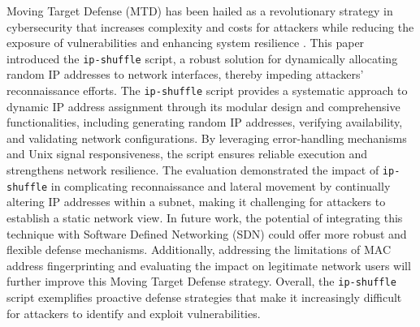 Moving Target Defense (MTD) has been hailed as a revolutionary strategy in cybersecurity that increases complexity and costs for attackers while reducing the exposure of vulnerabilities and enhancing system resilience \cite{cai2016network}. This paper introduced the \texttt{ip-shuffle} script, a robust solution for dynamically allocating random IP addresses to network interfaces, thereby impeding attackers' reconnaissance efforts.
The \texttt{ip-shuffle} script provides a systematic approach to dynamic IP address assignment through its modular design and comprehensive functionalities, including generating random IP addresses, verifying availability, and validating network configurations. By leveraging error-handling mechanisms and Unix signal responsiveness, the script ensures reliable execution and strengthens network resilience. The evaluation demonstrated the impact of \texttt{ip-shuffle} in complicating reconnaissance and lateral movement by continually altering IP addresses within a subnet, making it challenging for attackers to establish a static network view.
In future work, the potential of integrating this technique with Software Defined Networking (SDN) could offer more robust and flexible defense mechanisms. Additionally, addressing the limitations of MAC address fingerprinting and evaluating the impact on legitimate network users will further improve this Moving Target Defense strategy. Overall, the \texttt{ip-shuffle} script exemplifies proactive defense strategies that make it increasingly difficult for attackers to identify and exploit vulnerabilities.